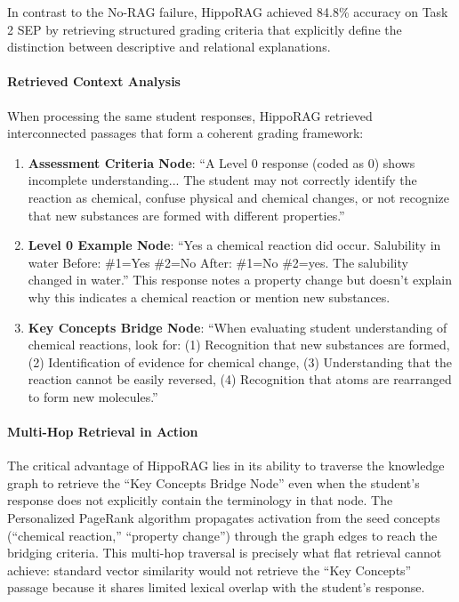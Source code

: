 \documentclass{edm_article}
\begin{document}
In contrast to the No-RAG failure, HippoRAG achieved 84.8\% accuracy on Task 2 SEP by retrieving structured grading criteria that explicitly define the distinction between descriptive and relational explanations.

\paragraph{Retrieved Context Analysis}
When processing the same student responses, HippoRAG retrieved interconnected passages that form a coherent grading framework:

\begin{enumerate}
\item \textbf{Assessment Criteria Node}: ``A Level 0 response (coded as 0) shows incomplete understanding... The student may not correctly identify the reaction as chemical, confuse physical and chemical changes, or not recognize that new substances are formed with different properties.''

\item \textbf{Level 0 Example Node}: ``Yes a chemical reaction did occur. Salubility in water Before: \#1=Yes \#2=No After: \#1=No \#2=yes. The salubility changed in water.'' This response notes a property change but doesn't explain why this indicates a chemical reaction or mention new substances.

\item \textbf{Key Concepts Bridge Node}: ``When evaluating student understanding of chemical reactions, look for: (1) Recognition that new substances are formed, (2) Identification of evidence for chemical change, (3) Understanding that the reaction cannot be easily reversed, (4) Recognition that atoms are rearranged to form new molecules.''
\end{enumerate}

\vspace{-12pt}

\paragraph{Multi-Hop Retrieval in Action}
The critical advantage of HippoRAG lies in its ability to traverse the knowledge graph to retrieve the ``Key Concepts Bridge Node'' even when the student's response does not explicitly contain the terminology in that node. The Personalized PageRank algorithm propagates activation from the seed concepts (``chemical reaction,'' ``property change'') through the graph edges to reach the bridging criteria. This multi-hop traversal is precisely what flat retrieval cannot achieve: standard vector similarity would not retrieve the ``Key Concepts'' passage because it shares limited lexical overlap with the student's response.
\end{document}
